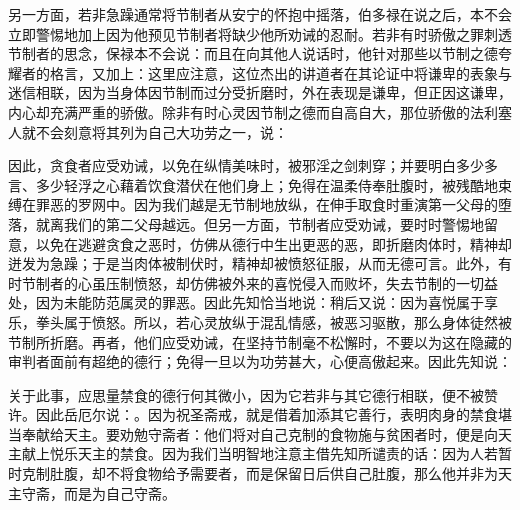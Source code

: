另一方面，若非急躁通常将节制者从安宁的怀抱中摇落，伯多禄在说之后，本不会立即警惕地加上因为他预见节制者将缺少他所劝诫的忍耐。若非有时骄傲之罪刺透节制者的思念，保禄本不会说：而且在向其他人说话时，他针对那些以节制之德夸耀者的格言，又加上：这里应注意，这位杰出的讲道者在其论证中将谦卑的表象与迷信相联，因为当身体因节制而过分受折磨时，外在表现是谦卑，但正因这谦卑，内心却充满严重的骄傲。除非有时心灵因节制之德而自高自大，那位骄傲的法利塞人就不会刻意将其列为自己大功劳之一，说：\par

因此，贪食者应受劝诫，以免在纵情美味时，被邪淫之剑刺穿；并要明白多少多言、多少轻浮之心藉着饮食潜伏在他们身上；免得在温柔侍奉肚腹时，被残酷地束缚在罪恶的罗网中。因为我们越是无节制地放纵，在伸手取食时重演第一父母的堕落，就离我们的第二父母越远。但另一方面，节制者应受劝诫，要时时警惕地留意，以免在逃避贪食之恶时，仿佛从德行中生出更恶的恶，即折磨肉体时，精神却迸发为急躁；于是当肉体被制伏时，精神却被愤怒征服，从而无德可言。此外，有时节制者的心虽压制愤怒，却仿佛被外来的喜悦侵入而败坏，失去节制的一切益处，因为未能防范属灵的罪恶。因此先知恰当地说：稍后又说：因为喜悦属于享乐，拳头属于愤怒。所以，若心灵放纵于混乱情感，被恶习驱散，那么身体徒然被节制所折磨。再者，他们应受劝诫，在坚持节制毫不松懈时，不要以为这在隐藏的审判者面前有超绝的德行；免得一旦以为功劳甚大，心便高傲起来。因此先知说：\par

关于此事，应思量禁食的德行何其微小，因为它若非与其它德行相联，便不被赞许。因此岳厄尔说：。因为祝圣斋戒，就是借着加添其它善行，表明肉身的禁食堪当奉献给天主。要劝勉守斋者：他们将对自己克制的食物施与贫困者时，便是向天主献上悦乐天主的禁食。因为我们当明智地注意主借先知所谴责的话：因为人若暂时克制肚腹，却不将食物给予需要者，而是保留日后供自己肚腹，那么他并非为天主守斋，而是为自己守斋。\par

